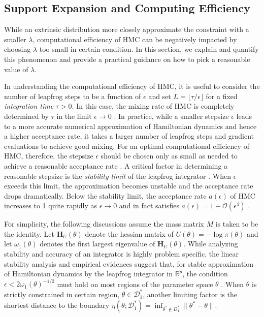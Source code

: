 \documentclass[10pt]{article}
\newcommand{\bb}[1]{\mathbb{#1}}
\newcommand{\mc}[1]{\mathcal{#1}}
\DeclareMathOperator{\1}{\mathbbm{1}}
\newcommand{\dt}{\epsilon} %
\newcommand{\mass}{M} %
\newcommand{\hess}{\mathbf{H}} %
\begin{document}
\subsection{Support Expansion and Computing Efficiency}

While an extrinsic distribution more closely approximate the constraint with a smaller $\lambda$, computational efficiency of HMC can be negatively impacted by choosing $\lambda$ too small in certain condition. In this section, we explain and quantify this phenomenon and provide a practical guidance on how to pick a reasonable value of $\lambda$.

In understanding the computational efficiency of HMC, it is useful to consider the number of leapfrog steps to be a function of $\dt$ and set $L = \lfloor \tau / \dt \rfloor$ for a fixed \textit{integration time} $\tau > 0$. In this case, the mixing rate of HMC is completely determined by $\tau$ in the limit $\dt \to 0$ \citep{betancourt17}. In practice, while a smaller stepsize $\dt$ leads to a more accurate numerical approximation of Hamiltonian dynamics and hence a higher acceptance rate, it takes a larger number of leapfrog steps and gradient evaluations to achieve good mixing. For an optimal computational efficiency of HMC, therefore, the stepsize $\dt$ should be chosen only as small as needed to achieve a reasonable acceptance rate \citep{beskos13, betancourt14}. A critical factor in determining a reasonable stepsize is the \textit{stability limit} of the leapfrog integrator \citep{neal2011mcmc}. When $\dt$ exceeds this limit, the approximation becomes unstable and the acceptance rate drops dramatically. Below the stability limit, the acceptance rate $a(\dt)$ of HMC increases to 1 quite rapidly as $\dt \to 0$ and in fact satisfies $a(\dt) = 1 - \mc O(\dt^4)$ \citep{beskos13}.

For simplicity, the following discussions assume the mass matrix $\mass$ is taken to be the identity. Let $\hess_U(\theta)$ denote the hessian matrix of $U(\theta) = - \log \pi(\theta)$ and let $\omega_1(\theta)$ denotes the first largest eigenvalue of $\hess_U(\theta)$. While analyzing stability and accuracy of an integrator is highly problem specific, the linear stability analysis and empirical evidences suggest that, for stable approximation of Hamiltonian dynamics by the leapfrog integrator in $\bb R^p$, the condition $\dt < 2\omega_1(\theta)^{-1/2}$ must hold on most regions of the parameter space $\theta$ \citep{hairer06}.
When $\theta$ is strictly constrained in certain region, $\theta\in \mc D^*_1$, another limiting factor is the shortest distance to the boundary $\eta (\theta; {\mc D^*_1})= \inf_{\theta^*\not\in D_1^*}\|\theta^*-\theta\|$.
\end{document}

